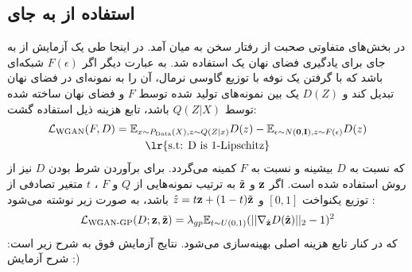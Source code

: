 	\subsection{استفاده از  \gan{} به جای \mmd{}}
	در بخش‌های متفاوتی صحبت از رفتار \modecollapse{}
	\gan{}
	سخن به میان آمد. در اینجا طی یک آزمایش از  به جای \mmd{} برای یادگیری فضای نهان یک \autoencoder{} استفاده شد. به عبارت دیگر اگر $F(\epsilon)$ شبکه‌ای باشد که با گرفتن یک نوفه با توزیع گاوسی نرمال، آن را به نمونه‌ای در فضای نهان تبدیل کند و $D(Z)$ یک \critic{} بین نمونه‌های تولید شده توسط $F$ و فضای نهان ساخته شده توسط \encoder{}
	$Q(Z|X)$
	باشد، تابع هزینه ذیل استفاده گشت:
	\begin{gather}
		\mathcal{L}_\text{WGAN} (F, D)=
		\expected_{x \sim P_\text{Data}(X), z \sim Q(Z|x)} D(z)
		- \expected_{\epsilon \sim N(\bff{0}, \bff{I}), z \sim F(\epsilon)} D(z)
		\\
		\text{\lr{s.t: D is 1-Lipschitz}} \nonumber
	\end{gather}
	که نسبت به $D$ بیشینه و نسبت به $F$ کمینه می‌گردد. برای برآوردن شرط  بودن $D$ نیز از روش  استفاده شده است. اگر ${\bf z}$ و $\tilde{{\bf z}}$ به ترتیب نمونه‌هایی از $Q$ و $F$ ،
	$t$
	متغیر تصادفی از توزیع یکنواخت $[0,1]$ و
	$\hat{z} = t{\bf z} + (1 - t) \tilde{{\bf z}}$
	باشد،  به صورت زیر نوشته می‌شود \cite{wgan_gp}:
	\begin{gather}
		\mathcal{L}_\text{WGAN-GP} (D; {\bf z}, \tilde{{\bf z}}) = \lambda_{gp} \mathbb E_{t \sim U(0, 1)}
		(|| \nabla_{\hat{{\bf z}}} D(\hat{{\bf z}}) ||_2  - 1)^2
	\end{gather}
	که در کنار تابع هزینه اصلی بهینه‌سازی می‌شود. نتایج آزمایش فوق به شرح زیر است:
	شرح آزمایش :)
	\\
\fi

